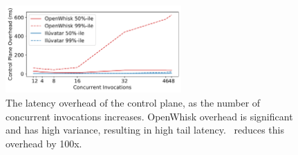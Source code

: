 \begin{figure}
  \centering  \includegraphics[width=0.6\textwidth]{iluvatar/graphs/scaling/pyaes/overhead-scaling.pdf}
  \caption{The latency overhead of the control plane, as the number of concurrent invocations increases. 
        OpenWhisk overhead is significant and has high variance, resulting in high tail latency. 
        \sysname~reduces this overhead by 100x. }
  \label{fig:ow-scaling}
\end{figure}


